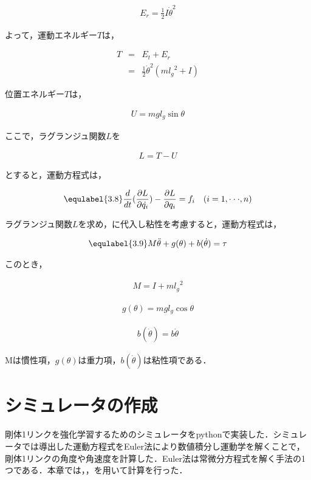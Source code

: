 \begin{eqnarray}
  E_{r} 
  =\frac{1}{2}I{\dot{\theta}}^2
\end{eqnarray}

よって，運動エネルギー$T$は，

\begin{eqnarray}
  T
  &=&E_{t} + E_{r} \nonumber \\
  &=&\frac{1}{2}{\dot{\theta}}^2(m{l_{g}}^2 + I)
\end{eqnarray}

位置エネルギー$T$は，

\begin{eqnarray}
  U
  = mgl_{g}\sin\theta
\end{eqnarray}

ここで，ラグランジュ関数$L$を

\begin{eqnarray}
  L
  =T - U
\end{eqnarray}

とすると，運動方程式は，

\begin{eqnarray}
  \equlabel{3.8}
  \frac{d}{dt}(\frac{\partial L}{\partial \dot{q_{i}}}) - \frac{\partial L}{\partial q_{i}} = f_{i} \quad (i = 1,\cdot\cdot\cdot, n)
\end{eqnarray}

ラグランジュ関数$L$を求め，に代入し粘性を考慮すると，運動方程式は，

\begin{eqnarray}
  \equlabel{3.9}
  M\ddot{\theta} + g(\theta) + b(\dot{\theta}) = \tau
\end{eqnarray}

このとき，

\begin{eqnarray}
  M = I + m{l_{g}}^2
\end{eqnarray}

\begin{eqnarray}
  g(\theta) = mgl_{g}\cos\theta
\end{eqnarray}

\begin{eqnarray}
  b(\dot{\theta}) = b\dot{\theta}
\end{eqnarray}

Mは慣性項，$g(\theta)$は重力項，$b(\dot{\theta})$は粘性項である．


\section{シミュレータの作成}
剛体1リンクを強化学習するためのシミュレータをpythonで実装した．シミュレータでは導出した運動方程式をEuler法\cite{euler}により数値積分し運動学を解くことで，剛体1リンクの角度や角速度を計算した．Euler法は常微分方程式を解く手法の1つである．本章では，，を用いて計算を行った．\\

